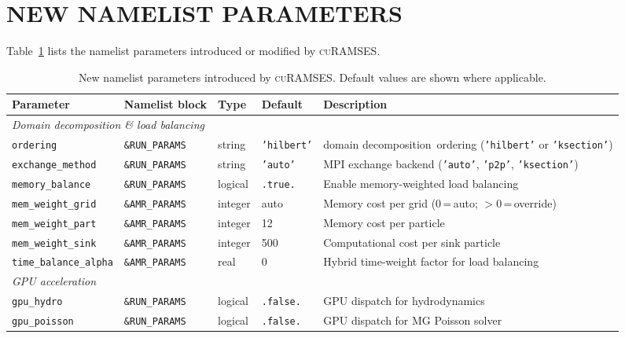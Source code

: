 \documentclass[fleqn,usenatbib]{mnras}
\newcommand{\curamses}{\textsc{cuRAMSES}}
\newcommand{\code}[1]{\texttt{#1}}
\newcommand{\dd}[0]{{domain decomposition}}
\begin{document}
\section{NEW NAMELIST PARAMETERS}
\label{app:namelist}

Table~\ref{tab:namelist} lists the namelist parameters introduced or
modified by \curamses.

\begin{table}
\centering
\caption{New namelist parameters introduced by \curamses.  Default
values are shown where applicable.}
\label{tab:namelist}
\small
\begin{tabular}{lllll}
\toprule
Parameter & Namelist block & Type & Default & Description \\
\midrule
\multicolumn{5}{l}{\textit{Domain decomposition \& load balancing}} \\
\code{ordering}        & \code{\&RUN\_PARAMS}   & string  & \code{'hilbert'} & \dd\ ordering (\code{'hilbert'} or \code{'ksection'}) \\
\code{exchange\_method} & \code{\&RUN\_PARAMS}  & string  & \code{'auto'}    & MPI exchange backend (\code{'auto'}, \code{'p2p'}, \code{'ksection'}) \\
\code{memory\_balance} & \code{\&RUN\_PARAMS}   & logical & \code{.true.}   & Enable memory-weighted load balancing \\
\code{mem\_weight\_grid} & \code{\&AMR\_PARAMS} & integer & auto             & Memory cost per grid (0\,=\,auto; $>0$\,=\,override) \\
\code{mem\_weight\_part} & \code{\&AMR\_PARAMS} & integer & 12               & Memory cost per particle \\
\code{mem\_weight\_sink} & \code{\&AMR\_PARAMS} & integer & 500              & Computational cost per sink particle \\
\code{time\_balance\_alpha} & \code{\&AMR\_PARAMS} & real & 0                & Hybrid time-weight factor for load balancing \\
\midrule
\multicolumn{5}{l}{\textit{GPU acceleration}} \\
\code{gpu\_hydro}      & \code{\&RUN\_PARAMS}   & logical & \code{.false.}   & GPU dispatch for hydrodynamics \\
\code{gpu\_poisson}    & \code{\&RUN\_PARAMS}   & logical & \code{.false.}   & GPU dispatch for MG Poisson solver \\

\end{tabular}
\end{table}
\end{document}
